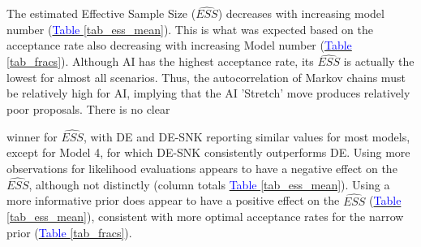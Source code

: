 The estimated Effective Sample Size ($\widehat{ESS}$) decreases with increasing model number (\hyperref[tab_ess_mean]{\textcolor{blue}{Table }\ref{tab_ess_mean}}). This is what was expected based on the acceptance rate also decreasing with increasing Model number (\hyperref[tab_fracs]{\textcolor{blue}{Table }\ref{tab_fracs}}). Although AI has the highest acceptance rate, its $\widehat{ESS}$ is actually the lowest for almost all scenarios. Thus, the autocorrelation of Markov chains must be relatively high for AI, implying that the AI 'Stretch' move produces relatively poor proposals. There is no clear 

\newpage
\noindent winner for $\widehat{ESS}$, with DE and DE-SNK reporting similar values for most models, except for Model 4, for which DE-SNK consistently outperforms DE. Using more observations for likelihood evaluations appears to have a negative effect on the $\widehat{ESS}$, although not distinctly (column totals \hyperref[tab_ess_mean]{\textcolor{blue}{Table }\ref{tab_ess_mean}}). Using a more informative prior does appear to have a positive effect on the $\widehat{ESS}$ (\hyperref[tab_ess_mean]{\textcolor{blue}{Table }\ref{tab_ess_mean}}), consistent with more optimal acceptance rates for the narrow prior (\hyperref[tab_fracs]{\textcolor{blue}{Table }\ref{tab_fracs}}). %

